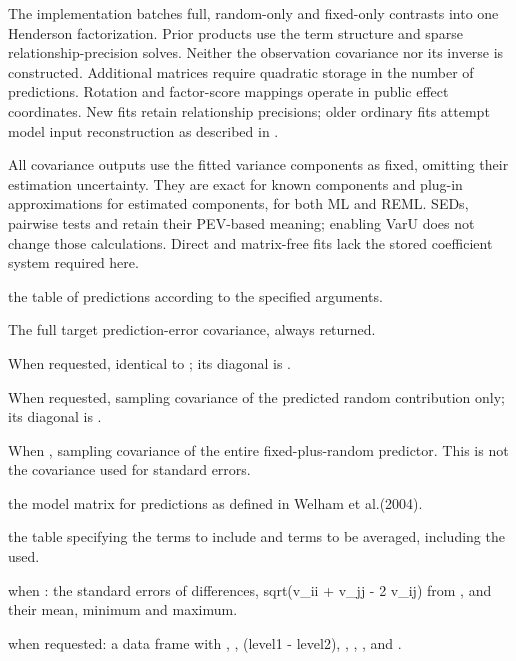 \documentclass[a4paper]{book}
\begin{document}
\begin{Details}
The implementation batches full, random-only and fixed-only contrasts into
one Henderson factorization. Prior products use the term structure
 and sparse relationship-precision solves.
Neither the observation covariance  nor its inverse is constructed.
Additional matrices require quadratic storage in the number of predictions.
Rotation and factor-score mappings operate in public effect coordinates.
New fits retain relationship precisions; older ordinary fits attempt model
input reconstruction as described in .

All covariance outputs use the fitted variance components as fixed,
omitting their estimation uncertainty. They are exact for known components
and plug-in approximations for estimated components, for both ML and REML.
SEDs, pairwise tests and  retain their PEV-based meaning;
enabling VarU does not change those calculations. Direct and matrix-free
 fits lack the stored coefficient system required here.


\end{Details}
%
\begin{Value}

\begin{ldescription}
\item[\code{pvals}] the table of predictions according to the specified arguments.

\item[\code{vcov}] The full target prediction-error covariance, always returned.
\item[\code{PEV}] When requested, identical to ; its diagonal is
.
\item[\code{VarU}] When requested, sampling covariance of the predicted random
contribution only; its diagonal is .
\item[\code{sampling.vcov}] When , sampling covariance of the entire
fixed-plus-random predictor. This is not the covariance used for standard errors.

\item[\code{D}] the model matrix for predictions as defined in Welham et al.(2004).

\item[\code{Dtable}] the table specifying the terms to include and terms to be averaged, including the  used.

\item[\code{sed, avsed}] when : the standard errors of differences, sqrt(v\_ii + v\_jj - 2 v\_ij) from , and their mean, minimum and maximum.

\item[\code{pairwise}] when requested: a data frame with , ,  (level1 - level2), , , ,  and .

\end{ldescription}
\end{Value}
\end{document}
